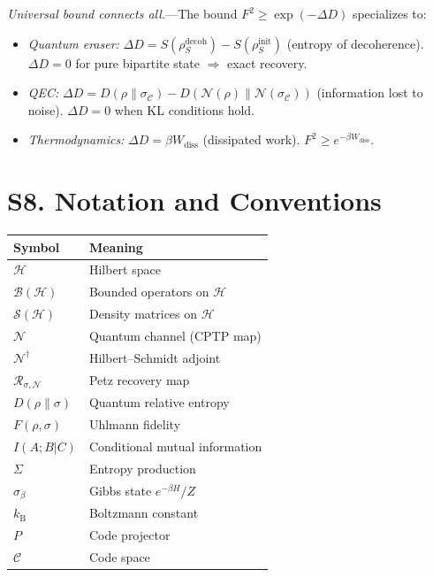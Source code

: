 \documentclass[prl,twocolumn,superscriptaddress,longbibliography]{revtex4-2}
\newcommand{\kB}{k_{\mathrm{B}}}
\newcommand{\Petz}{\mathcal{R}}
\newcommand{\chan}{\mathcal{N}}
\newcommand{\hilb}{\mathcal{H}}
\newcommand{\code}{\mathcal{C}}
\begin{document}
\emph{Universal bound connects all.}---The bound
$F^2 \geq \exp(-\Delta D)$ specializes to:
\begin{itemize}
\item \emph{Quantum eraser:} $\Delta D = S(\rho_S^{\mathrm{decoh}}) -
  S(\rho_S^{\mathrm{init}})$ (entropy of decoherence).
  $\Delta D = 0$ for pure bipartite state $\Rightarrow$ exact recovery.
\item \emph{QEC:} $\Delta D = D(\rho\|\sigma_\code) -
  D(\chan(\rho)\|\chan(\sigma_\code))$ (information lost to noise).
  $\Delta D = 0$ when KL conditions hold.
\item \emph{Thermodynamics:} $\Delta D = \beta W_{\mathrm{diss}}$
  (dissipated work). $F^2 \geq e^{-\beta W_{\mathrm{diss}}}$.
\end{itemize}

\section{S8. Notation and Conventions}
\label{sec:notation}

\begin{center}
\begin{tabular}{ll}
\toprule
\textbf{Symbol} & \textbf{Meaning} \\
\midrule
$\hilb$ & Hilbert space \\
$\mathcal{B}(\hilb)$ & Bounded operators on $\hilb$ \\
$\mathcal{S}(\hilb)$ & Density matrices on $\hilb$ \\
$\chan$ & Quantum channel (CPTP map) \\
$\chan^\dagger$ & Hilbert--Schmidt adjoint \\
$\Petz_{\sigma,\chan}$ & Petz recovery map \\
$D(\rho\|\sigma)$ & Quantum relative entropy \\
$F(\rho,\sigma)$ & Uhlmann fidelity \\
$I(A;B|C)$ & Conditional mutual information \\
$\Sigma$ & Entropy production \\
$\sigma_\beta$ & Gibbs state $e^{-\beta H}/Z$ \\
$\kB$ & Boltzmann constant \\
$P$ & Code projector \\
$\code$ & Code space \\
\bottomrule
\end{tabular}
\end{center}
\end{document}
